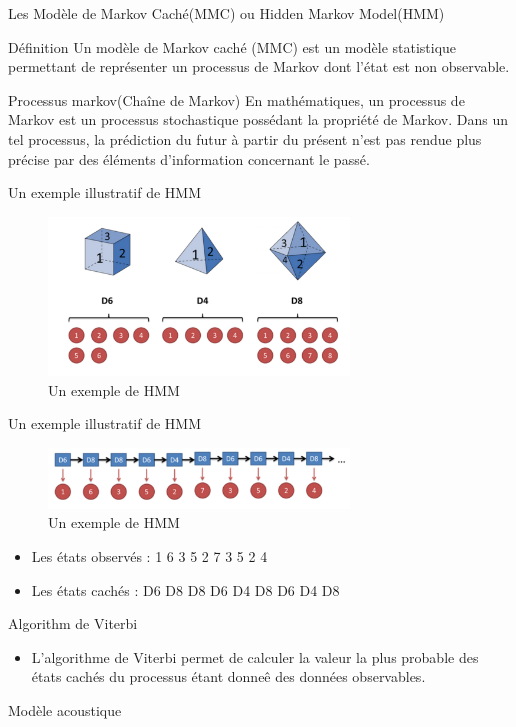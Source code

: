 \begin{frame}{Les Modèle de Markov Caché(MMC) ou Hidden Markov Model(HMM)}

\begin{block}{Définition}
Un modèle de Markov caché (MMC) est un modèle
statistique permettant de représenter un processus
de Markov dont l’état est non observable. 
	\end{block}
	\begin{block}{Processus markov(Chaîne de Markov)}
	En mathématiques, un processus de Markov est un processus stochastique possédant la propriété de Markov. Dans un tel processus, la prédiction du futur à partir du présent n'est pas rendue plus précise par des éléments d'information concernant le passé.
	\end{block}
\end{frame}


\begin{frame}{Un exemple illustratif de HMM}
\begin{figure}
\centering
\includegraphics[width=8cm]{images/hmm.png}
\caption{Un exemple de HMM}
\end{figure}
\end{frame}



\begin{frame}{Un exemple illustratif de HMM}

\begin{figure}
\centering
\includegraphics[width=8cm]{images/hmm1.png}
\caption{Un exemple de HMM}
\end{figure}
\begin{itemize}
\item Les états observés : 1 6 3 5 2 7 3 5 2 4
\item Les états cachés : D6 D8 D8 D6 D4 D8 D6 D4 D8
\end{itemize}

\end{frame}

\begin{frame}{Algorithm de Viterbi}

\begin{itemize}
\item L’algorithme de Viterbi permet de calculer
la valeur la plus probable des états cachés du processus
étant donneê des données observables. 
\end{itemize}

\end{frame}

\begin{frame}{Modèle acoustique}

	
\end{frame}